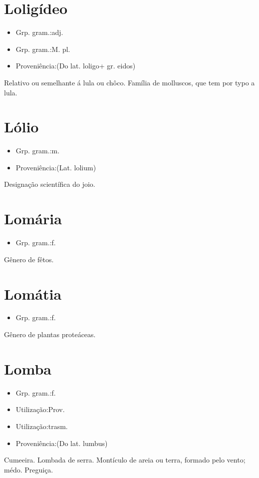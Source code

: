 \section{Loligídeo}
\begin{itemize}
\item {Grp. gram.:adj.}
\end{itemize}
\begin{itemize}
\item {Grp. gram.:M. pl.}
\end{itemize}
\begin{itemize}
\item {Proveniência:(Do lat. \textunderscore loligo\textunderscore  + gr. \textunderscore eidos\textunderscore )}
\end{itemize}
Relativo ou semelhante á lula ou chôco.
Família de molluscos, que tem por typo a lula.
\section{Lólio}
\begin{itemize}
\item {Grp. gram.:m.}
\end{itemize}
\begin{itemize}
\item {Proveniência:(Lat. \textunderscore lolium\textunderscore )}
\end{itemize}
Designação scientífica do joio.
\section{Lomária}
\begin{itemize}
\item {Grp. gram.:f.}
\end{itemize}
Gênero de fêtos.
\section{Lomátia}
\begin{itemize}
\item {Grp. gram.:f.}
\end{itemize}
Gênero de plantas proteáceas.
\section{Lomba}
\begin{itemize}
\item {Grp. gram.:f.}
\end{itemize}
\begin{itemize}
\item {Utilização:Prov.}
\end{itemize}
\begin{itemize}
\item {Utilização:trasm.}
\end{itemize}
\begin{itemize}
\item {Proveniência:(Do lat. \textunderscore lumbus\textunderscore )}
\end{itemize}
Cumeeira.
Lombada de serra.
Montículo de areia ou terra, formado pelo vento; médo.
Preguiça.
